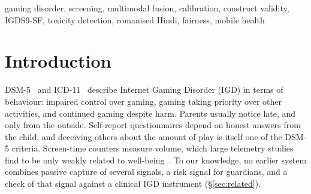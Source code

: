 \documentclass[conference]{IEEEtran}
\begin{document}
\begin{IEEEkeywords}
gaming disorder, screening, multimodal fusion, calibration, construct validity,
IGDS9-SF, toxicity detection, romanised Hindi, fairness, mobile health
\end{IEEEkeywords}

\section{Introduction}
DSM-5~\cite{dsm5} and ICD-11~\cite{icd11} describe Internet Gaming Disorder (IGD) in
terms of behaviour: impaired control over gaming, gaming taking priority over other
activities, and continued gaming despite harm. Parents usually notice late, and only
from the outside. Self-report questionnaires depend on honest answers from the child,
and deceiving others about the amount of play is itself one of the DSM-5 criteria.
Screen-time counters measure volume, which large telemetry studies find to be only
weakly related to well-being~\cite{johannes2021,vuorre2022}. To our knowledge, no
earlier system combines passive capture of several signals, a risk signal for
guardians, and a check of that signal against a clinical IGD instrument
(\S\ref{sec:related}).
\end{document}
